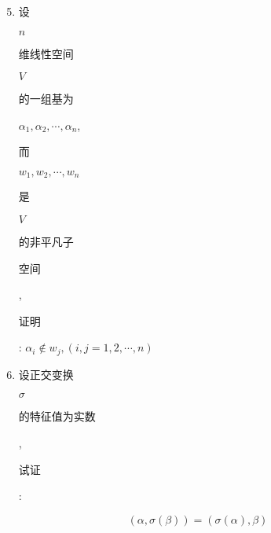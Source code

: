\documentclass[10pt]{article}
\begin{document}
\begin{enumerate}
  \setcounter{enumi}{4}
  \item \begin{CJK}{UTF8}{mj}设\end{CJK} $n$ \begin{CJK}{UTF8}{mj}维线性空间\end{CJK} $V$ \begin{CJK}{UTF8}{mj}的一组基为\end{CJK} $\alpha_{1}, \alpha_{2}, \cdots, \alpha_{n}$, \begin{CJK}{UTF8}{mj}而\end{CJK} $w_{1}, w_{2}, \cdots, w_{n}$ \begin{CJK}{UTF8}{mj}是\end{CJK} $V$ \begin{CJK}{UTF8}{mj}的非平凡子\end{CJK} \begin{CJK}{UTF8}{mj}空间\end{CJK}, \begin{CJK}{UTF8}{mj}证明\end{CJK}: $\alpha_{i} \notin w_{j},(i, j=1,2, \cdots, n)$

  \item \begin{CJK}{UTF8}{mj}设正交变换\end{CJK} $\sigma$ \begin{CJK}{UTF8}{mj}的特征值为实数\end{CJK}, \begin{CJK}{UTF8}{mj}试证\end{CJK}:

\end{enumerate}
$$
(\alpha, \sigma(\beta))=(\sigma(\alpha), \beta)
$$
\end{document}
